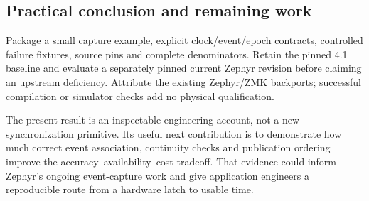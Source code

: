 \documentclass[10pt,letterpaper]{article}
\begin{document}
\subsection{Practical conclusion and remaining work}
Package a small capture example, explicit clock/event/epoch contracts, controlled failure fixtures, source pins and complete denominators. Retain the pinned 4.1 baseline and evaluate a separately pinned current Zephyr revision before claiming an upstream deficiency. Attribute the existing Zephyr/ZMK backports; successful compilation or simulator checks add no physical qualification.

The present result is an inspectable engineering account, not a new synchronization primitive. Its useful next contribution is to demonstrate how much correct event association, continuity checks and publication ordering improve the accuracy--availability--cost tradeoff. That evidence could inform Zephyr's ongoing event-capture work and give application engineers a reproducible route from a hardware latch to usable time.
\end{document}
